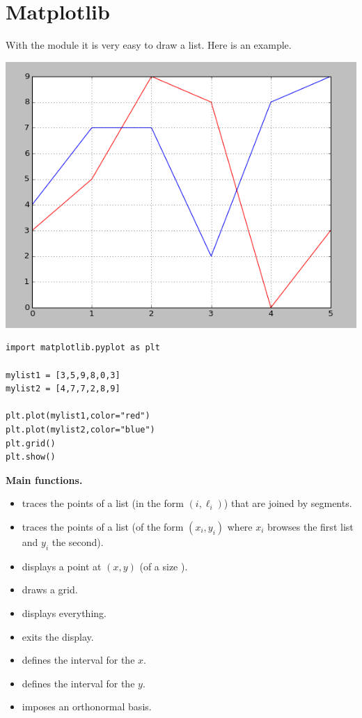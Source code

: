 \documentclass[11pt,class=report,crop=false]{standalone}
\begin{document}
\section{Matplotlib}

With the  module it is very easy to draw a list. Here is an example.

\begin{center}
\includegraphics[scale=\myscale,scale=0.5]{../lists/screen-lists-lesson-visualization}
\end{center}

\begin{lstlisting}
import matplotlib.pyplot as plt

mylist1 = [3,5,9,8,0,3]
mylist2 = [4,7,7,2,8,9]

plt.plot(mylist1,color="red")
plt.plot(mylist2,color="blue")
plt.grid()
plt.show()
\end{lstlisting}


\textbf{Main functions.}

\begin{itemize}
  \item {} traces the points of a list (in the form $(i,\ell_i)$)  that are joined by segments. 
  \item {} traces the points of a list (of the form  $(x_i,y_i)$ where $x_i$ browses the first list and $y_i$ the second).    
  \item {} displays a point at $(x,y)$ (of a size ).
  \item {} draws a grid.  
  \item {} displays everything. 
  \item {} exits the display.
  
  \item {} defines the interval for the $x$.
  \item {} defines the interval for the $y$.
  \item {} imposes an orthonormal basis.  
\end{itemize}
\end{document}
